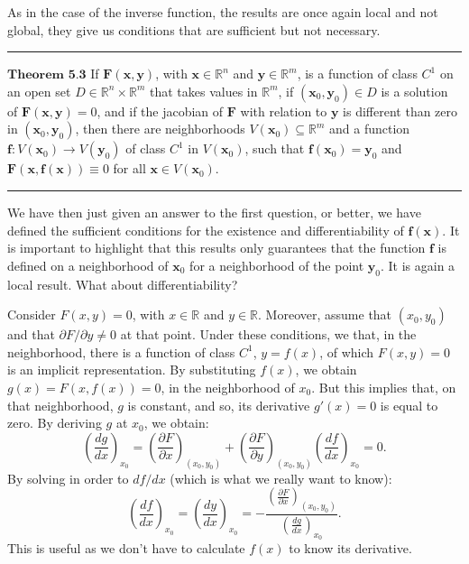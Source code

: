 \documentclass[0pt, a4paper]{article}
\begin{document}
As in the case of the inverse function, the results are once again local and not global, they give us conditions that are sufficient but not necessary.

\noindent\rule{\textwidth}{1pt}

$\textbf{Theorem 5.3}$ If $\textbf{F}(\textbf{x},\textbf{y})$, with $\textbf{x}\in\mathbb{R}^n$ and $\textbf{y}\in\mathbb{R}^m$, is a function of class $C^1$ on an open set $D\in\mathbb{R}^n\times\mathbb{R}^m$ that takes values in $\mathbb{R}^m$, if $(\textbf{x}_0, \textbf{y}_0)\in D$ is a solution of $\textbf{F}(\textbf{x},\textbf{y})=0$, and if the jacobian of $\textbf{F}$ with relation to $\textbf{y}$ is different than zero in $(\textbf{x}_0,\textbf{y}_0)$, then there are neighborhoods $V(\textbf{x}_0)\subseteq\mathbb{R}^m$ and a function $\textbf{f}:V(\textbf{x}_0)\to V(\textbf{y}_0)$ of class $C^1$ in $V(\textbf{x}_0)$, such that $\textbf{f}(\textbf{x}_0)=\textbf{y}_0$ and $\textbf{F}(\textbf{x},\textbf{f}(\textbf{x}))\equiv0$ for all $\textbf{x}\in V(\textbf{x}_0)$.

\noindent\rule{\textwidth}{1pt}

We have then just given an answer to the first question, or better, we have defined the sufficient conditions for the existence and differentiability of $\textbf{f}(\textbf{x})$. It is important to highlight that this results only guarantees that the function $\textbf{f}$ is defined on a neighborhood of $\textbf{x}_0$ for a neighborhood of the point $\textbf{y}_0$. It is again a local result. What about differentiability?

Consider $F(x,y)=0$, with $x\in\mathbb{R}$ and $y\in\mathbb{R}$. Moreover, assume that $(x_0,y_0)$ and that $\partial F/\partial y \neq 0$ at that point. Under these conditions, we that, in the neighborhood, there is a function of class $C^1$, $y=f(x)$, of which $F(x,y)=0$ is an implicit representation. By substituting $f(x)$, we obtain $g(x)=F(x,f(x))=0$, in the neighborhood of $x_0$. But this implies that, on that neighborhood, $g$ is constant, and so, its derivative $g'(x)=0$ is equal to zero. By deriving $g$ at $x_0$, we obtain:
$$\left(\frac{dg}{dx}\right)_{x_0}=\left(\frac{\partial F}{\partial x}\right)_{(x_0,y_0)}+\left(\frac{\partial F}{\partial y}\right)_{(x_0,y_0)}\left(\frac{df}{dx}\right)_{x_0}=0.$$
By solving in order to $df/dx$ (which is what we really want to know):
$$\left(\frac{df}{dx}\right)_{x_0}=\left(\frac{dy}{dx}\right)_{x_0}=-\frac{\left(\frac{\partial F}{\partial x}\right)_{(x_0,y_0)}}{\left(\frac{dg}{dx}\right)_{x_0}}.$$
This is useful as we don't have to calculate $f(x)$ to know its derivative.
\end{document}
